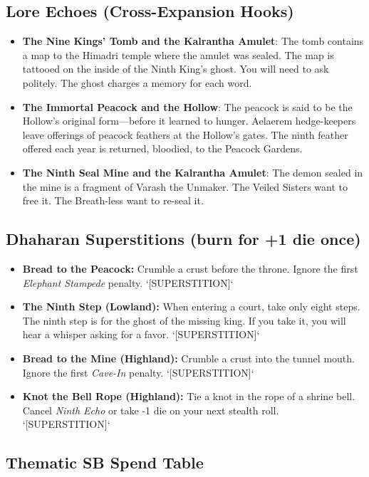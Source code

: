 \subsection*{Lore Echoes (Cross-Expansion Hooks)}
\begin{itemize}
  \item \textbf{The Nine Kings' Tomb and the Kalrantha Amulet}: The tomb contains a map to the Himadri temple where the amulet was sealed. The map is tattooed on the inside of the Ninth King's ghost. You will need to ask politely. The ghost charges a memory for each word.
  \item \textbf{The Immortal Peacock and the Hollow}: The peacock is said to be the Hollow's original form---before it learned to hunger. Aelaerem hedge-keepers leave offerings of peacock feathers at the Hollow's gates. The ninth feather offered each year is returned, bloodied, to the Peacock Gardens.
  \item \textbf{The Ninth Seal Mine and the Kalrantha Amulet}: The demon sealed in the mine is a fragment of Varash the Unmaker. The Veiled Sisters want to free it. The Breath-less want to re-seal it.
\end{itemize}

\subsection*{Dhaharan Superstitions (burn for +1 die once)}
\begin{itemize}
  \item \textbf{Bread to the Peacock:} Crumble a crust before the throne. Ignore the first \emph{Elephant Stampede} penalty. `[SUPERSTITION]`
  \item \textbf{The Ninth Step (Lowland):} When entering a court, take only eight steps. The ninth step is for the ghost of the missing king. If you take it, you will hear a whisper asking for a favor. `[SUPERSTITION]`
  \item \textbf{Bread to the Mine (Highland):} Crumble a crust into the tunnel mouth. Ignore the first \emph{Cave-In} penalty. `[SUPERSTITION]`
  \item \textbf{Knot the Bell Rope (Highland):} Tie a knot in the rope of a shrine bell. Cancel \emph{Ninth Echo} or take -1 die on your next stealth roll. `[SUPERSTITION]`
\end{itemize}

\subsection*{Thematic SB Spend Table}
\label{sec:dhahara-sb}

